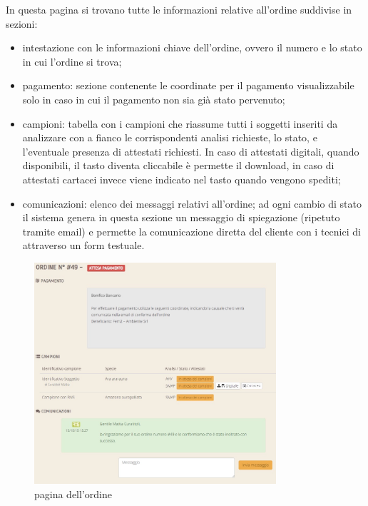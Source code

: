 In questa pagina si trovano tutte le informazioni relative all'ordine suddivise in sezioni:
\begin{itemize}
 \item \textsf{intestazione} con le informazioni chiave dell'ordine, ovvero il numero e lo stato in cui l'ordine si trova;
 \item \textsf{pagamento}: sezione contenente le coordinate per il pagamento visualizzabile solo in caso in cui il pagamento non sia già stato pervenuto;
 \item \textsf{campioni}: tabella con i campioni che riassume tutti i soggetti inseriti da analizzare con a fianco le corrispondenti analisi richieste, lo stato, e l'eventuale presenza di attestati richiesti. In caso di attestati digitali, quando disponibili, il tasto diventa cliccabile è permette il download, in caso di attestati cartacei  invece viene indicato nel tasto quando vengono spediti;
 \item \textsf{comunicazioni}: elenco dei messaggi relativi all'ordine; ad ogni cambio di stato il sistema genera in questa sezione un messaggio di spiegazione (ripetuto tramite email) e permette la comunicazione diretta del cliente con i tecnici di {\fem} attraverso un form testuale.
\end{itemize}

\begin{figure}
 \centering
 \includegraphics[width=0.8\textwidth]{images/cl-ordine}
 \caption{pagina dell'ordine}
 \label{fig:cl-ordine} 
\end{figure}